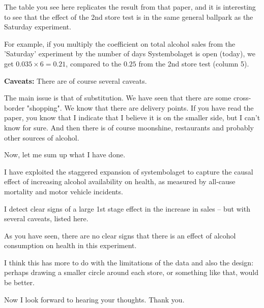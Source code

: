 \documentclass[12pt]{article}
\begin{document}
The table you see here replicates the result from that paper, and it is interesting to see that the effect of the 2nd store test is in the same general ballpark as the Saturday experiment. 

For example, if you multiply the coefficient on total alcohol sales from the 'Saturday' experiment by the number of days Systembolaget is open (today), we get $0.035 \times 6 = 0.21$, compared to the $0.25$ from the 2nd store test (column 5). 

\textbf{Caveats:} There are of course several caveats.

The main issue is that of substitution. We have seen that there are some cross-border "shopping". We know that there are delivery points. If you have read the paper, you know that I indicate that I believe it is on the smaller side, but I can't know for sure. And then there is of course moonshine, restaurants and probably other sources of alcohol. 

Now, let me sum up what I have done.

I have exploited the staggered expansion of systembolaget to capture the causal effect of increasing alcohol availability on health, as measured by all-cause mortality and motor vehicle incidents. 

I detect clear signs of a large 1st stage effect in the increase in sales -- but with several caveats, listed here.

As you have seen, there are no clear signs that there is an effect of alcohol consumption on health in this experiment. 

I think this has more to do with the limitations of the data and also the design: perhaps drawing a smaller circle around each store, or something like that, would be better.

Now I look forward to hearing your thoughts. Thank you.
 
\end{document}
